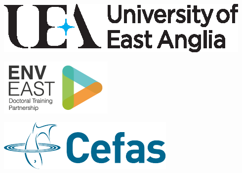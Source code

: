 \documentclass[paper=a4]{scrartcl}
\begin{document}
\begin{center}
\begin{minipage}{0.2\linewidth}
    \includegraphics[width=\linewidth]{uealogo_horizontal.eps}
\end{minipage}
\hspace{2cm}
\begin{minipage}{0.2\linewidth}
    \includegraphics[width=\linewidth]{enveast_logo.png}
\end{minipage}
\hspace{2cm}
\begin{minipage}{0.2\linewidth}
    \includegraphics[width=\linewidth]{cefas_logo.pdf}
\end{minipage}
\end{center}
\end{document}

